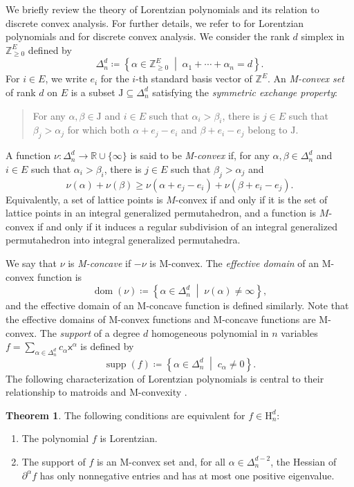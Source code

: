 \documentclass{amsart}
\theoremstyle{definition}
\newtheorem{theorem}{Theorem}[section]
\theoremstyle{remark}
\newcommand{\set}[1]{\left\{#1\right\}}             %
\newcommand{\Z}{\mathbb{Z}}
\newcommand{\R}{\mathbb{R}}
\newcommand{\x}{\mathsf{x}}    %
\DeclareMathOperator{\supp}{supp} %
\DeclareMathOperator{\dom}{{dom}}          %
\newcommand{\1}{\mathbf{1}}
\newcommand{\HH}{\mathrm{H}}
\numberwithin{equation}{section}
\begin{document}
We briefly review the theory of Lorentzian polynomials and its relation to  discrete convex analysis.
For further details, we refer to \cite{BH20} for Lorentzian polynomials and \cite{Mu03} for discrete convex analysis. 
We consider 
 the rank $d$ simplex in $\Z_{\ge 0}^E$ defined by
\[
\Delta_n^d \coloneqq  \set{\alpha \in \Z_{\geq0} ^{E} \;\middle|\;  \alpha_1 + \dotsb + \alpha_n = d}.
\] 
For $i \in E$, we write $e_i$ for the $i$-th standard basis vector of $\Z^{E}$. 
An \emph{M-convex set} of rank $d$ on $E$ is a subset $\mathrm{J}\subseteq \Delta_n^d$ satisfying the \emph{symmetric exchange property}: 
\begin{quote}
For any $\alpha, \beta \in \mathrm{J}$ and $i \in E$ such that $\alpha_i > \beta_i$, there is $j \in E$ such that $\beta_j >\alpha_j$ for which both $\alpha + e_j -e_i$ and $\beta +e_i-e_j$ belong to $\mathrm{J}$. 
\end{quote}
A function $\nu\colon \Delta_n^d \to \R \cup \{\infty\}$ is said to be \emph{M-convex} if, 
for any $\alpha, \beta \in \Delta_n^d$ and $i\in E$ such that $\alpha_i > \beta_i$, there is $j\in E$ such that $\beta_j >\alpha_j$ and
\[
\nu(\alpha) + \nu(\beta)\ge \nu(\alpha + e_j -e_i) + \nu(\beta +e_i-e_j).
\]
Equivalently, a set of lattice points is $M$-convex if and only if it is the set of lattice points in an integral generalized permutahedron, and a function is $M$-convex if and only if it induces a regular subdivision of an integral generalized permutahedron into integral generalized permutahedra.

We say that $\nu$ is \emph{M-concave} if $-\nu$ is M-convex.
The \emph{effective domain} of an M-convex function is 
\[
\dom(\nu)\coloneqq \set{\alpha\in \Delta_n^d  \;\middle|\;   \nu(\alpha) \neq \infty},
\]
and the effective domain of an M-concave function is defined similarly. 
Note that the effective domains of M-convex functions and M-concave functions are M-convex.
The \emph{support} of  a degree $d$ homogeneous polynomial in $n$ variables $f=\sum_{\alpha \in \Delta_n^{d}} c_\alpha \x^\alpha$ is defined by
\[
\supp(f) \coloneqq \set{ \alpha \in \Delta_n^{d} \;\middle|\; c_\alpha \neq 0 }.
\]
The following characterization of Lorentzian polynomials is central to their relationship to matroids and M-convexity \cite[Theorem 2.25]{BH20}.

\begin{theorem}\label{thm:Lorentzian}
The following conditions are equivalent for $f \in \HH^d_n$:
    \begin{enumerate}[(1)]\itemsep 5pt
        \item The polynomial $f$ is Lorentzian.
        \item The support of $f$ is an M-convex set and, for all $\alpha \in \Delta_n^{d-2}$, the Hessian of ${\partial^\alpha f}$ has only nonnegative entries and has at most one positive eigenvalue.
    \end{enumerate}
\end{theorem}
\end{document}
